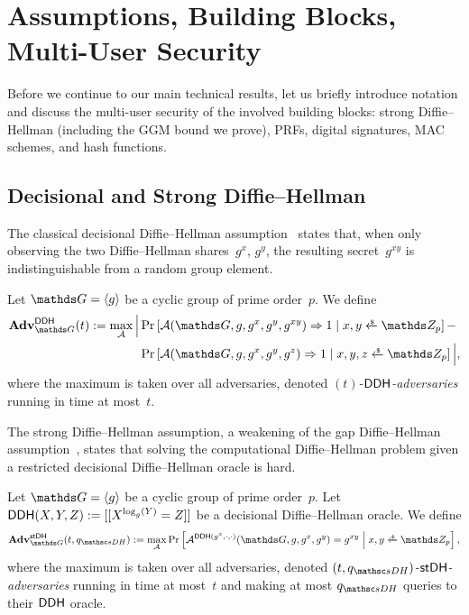 \section{Assumptions, Building Blocks, Multi-User Security}
\iffull \label{sec:components} \else \label{apx:components} \fi

\iffull
Before we continue to our main technical results, let us briefly introduce notation and discuss the multi-user security of the involved building blocks: strong Diffie--Hellman (including the GGM bound we prove), PRFs, digital signatures, MAC schemes, and hash functions.
\fi


\iffull
\subsection{Decisional and Strong Diffie--Hellman}
\label{sec:components:DH}

The classical decisional Diffie--Hellman assumption~\cite{Boneh98} states that, when only observing the two Diffie--Hellman shares~$g^x$, $g^y$, the resulting secret~$g^{xy}$ is indistinguishable from a random group element.

\begin{definition}
	\label{def:DDH}
	Let $\group = \langle g \rangle$ be a cyclic group of prime order~$p$.
	We define
	\begin{align*}
		\Adv^{\DDH}_{\group}(t) := \max_\advA \Big|
			&\Pr \left[ \advA(\group, g, g^x, g^y, g^{xy}) \Rightarrow 1 \;\middle|\; x, y \sample \ZZ_p \right] - \\
			&\Pr \left[ \advA(\group, g, g^x, g^y, g^z) \Rightarrow 1 \;\middle|\; x, y, z \sample \ZZ_p \right]
			\Big|,
	\end{align*}
	where the maximum is taken over all adversaries, denoted \emph{$(t)$-$\mathsf{DDH}$-adversaries} running in time at most~$t$.
\end{definition}

The strong Diffie--Hellman assumption, a weakening of the gap Diffie--Hellman assumption~\cite{PKC:OkaPoi01}, states that solving the computational Diffie--Hellman problem given a restricted decisional Diffie--Hellman oracle is hard.

\begin{definition}
	\label{def:strongDH}
	Let $\group = \langle g \rangle$ be a cyclic group of prime order~$p$.
	Let $\mathsf{DDH}(X, Y, Z) := [[ X^{\log_g(Y)} = Z ]]$ be a decisional Diffie--Hellman oracle.
	We define
	\[
		\Adv^{\strongDH}_{\group}(t, \qstDH) := \max_\advA \Pr \left[ \advA^{\DDH(g^x, \cdot, \cdot)}(\group, g, g^x, g^y) = g^{xy} \;\middle|\; x, y \sample \ZZ_p \right],
	\]
	where the maximum is taken over all adversaries, denoted \emph{$(t, \qstDH)$-$\mathsf{stDH}$-adversaries} running in time at most~$t$ and making at most $\qstDH$ queries to their $\mathsf{DDH}$ oracle.
\end{definition}

